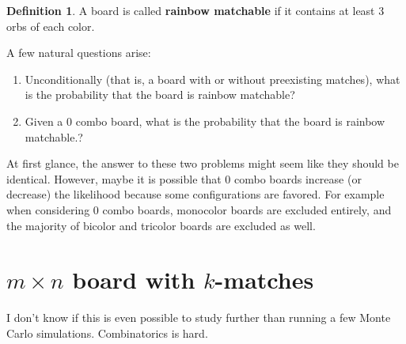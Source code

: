 \documentclass[12pt]{article}
\theoremstyle{definition}
\newtheorem{definition}{Definition}[section]
\begin{document}
\begin{definition}
    A board is called \textbf{rainbow matchable} if it contains at least 3 orbs of each color.
\end{definition}

A few natural questions arise:
\begin{enumerate}
    \item Unconditionally (that is, a board with or without preexisting matches), what is the probability that the board is rainbow matchable?
    \item Given a 0 combo board, what is the probability that the board is rainbow matchable.?
\end{enumerate}
At first glance, the answer to these two problems might seem like they should be identical. However, maybe it is possible that 0 combo boards increase (or decrease) the likelihood because some configurations are favored. For example when considering 0 combo boards, monocolor boards are excluded entirely, and the majority of bicolor and tricolor boards are excluded as well.
\section{$m\times n$ board with $k$-matches}
I don't know if this is even possible to study further than running a few Monte Carlo simulations. Combinatorics is hard.
\end{document}
